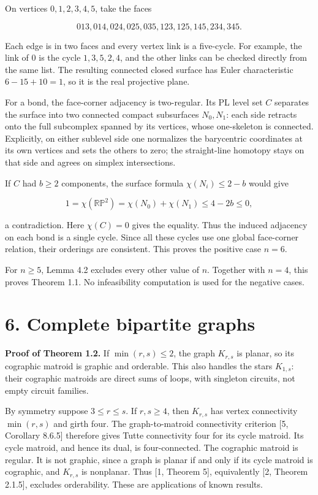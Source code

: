 \documentclass[11pt]{article}
\begin{document}
On vertices $0,1,2,3,4,5$, take the faces

\[
013,014,024,025,035,123,125,145,234,345.
\]

Each edge is in two faces and every vertex link is a five-cycle. For example, the link of $0$ is the cycle $1,3,5,2,4$, and the other links can be checked directly from the same list. The resulting connected closed surface has Euler characteristic $6-15+10=1$, so it is the real projective plane.

For a bond, the face-corner adjacency is two-regular. Its PL level set $C$ separates the surface into two connected compact subsurfaces $N_0,N_1$: each side retracts onto the full subcomplex spanned by its vertices, whose one-skeleton is connected. Explicitly, on either sublevel side one normalizes the barycentric coordinates at its own vertices and sets the others to zero; the straight-line homotopy stays on that side and agrees on simplex intersections.

If $C$ had $b\ge2$ components, the surface formula $\chi(N_i)\le2-b$ would give

\[
1=\chi(\mathbb{RP}^2)=\chi(N_0)+\chi(N_1)\le4-2b\le0,
\]

a contradiction. Here $\chi(C)=0$ gives the equality. Thus the induced adjacency on each bond is a single cycle. Since all these cycles use one global face-corner relation, their orderings are consistent. This proves the positive case $n=6$.

For $n\ge5$, Lemma 4.2 excludes every other value of $n$. Together with $n=4$, this proves Theorem 1.1. No infeasibility computation is used for the negative cases.

\section*{6. Complete bipartite graphs}

\textbf{Proof of Theorem 1.2.} If $\min(r,s)\le2$, the graph $K_{r,s}$ is planar, so its cographic matroid is graphic and orderable. This also handles the stars $K_{1,s}$: their cographic matroids are direct sums of loops, with singleton circuits, not empty circuit families.

By symmetry suppose $3\le r\le s$. If $r,s\ge4$, then $K_{r,s}$ has vertex connectivity $\min(r,s)$ and girth four. The graph-to-matroid connectivity criterion [5, Corollary 8.6.5] therefore gives Tutte connectivity four for its cycle matroid. Its cycle matroid, and hence its dual, is four-connected. The cographic matroid is regular. It is not graphic, since a graph is planar if and only if its cycle matroid is cographic, and $K_{r,s}$ is nonplanar. Thus [1, Theorem 5], equivalently [2, Theorem 2.1.5], excludes orderability. These are applications of known results.
\end{document}
